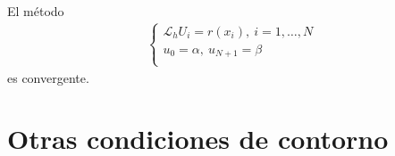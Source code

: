 \begin{cor}
    El método
    \begin{align*}
        \left\{ \begin{array}{lcc}
                    \mathcal{L}_hU_i = r(x_i), \ i = 1,\ldots,N \\
                    u_0 = \alpha, \ u_{N+1} = \beta             \\
                \end{array}
        \right.
    \end{align*}
    es convergente.
\end{cor}

\section{Otras condiciones de contorno}

